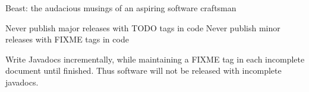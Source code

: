\documentclass{article}
\begin{document}
Beast: the audacious musings of an aspiring software craftsman


Never publish major releases with TODO tags in code
Never publish minor releases with FIXME tags in code

Write Javadocs incrementally, while maintaining a FIXME tag in each incomplete document until finished. 
Thus software will not be released with incomplete javadocs.
\end{document}
